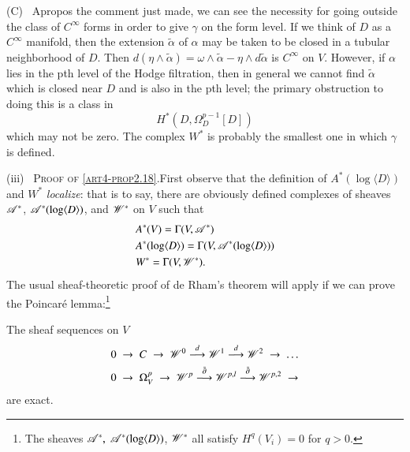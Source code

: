 \medskip
\noindent
(C)~ Apropos the comment just made, we can see the necessity for going outside the class of $C^\infty$ forms in order to give $\gamma$ on the form level. If we think of $D$ as a $C^\infty$ manifold, then the extension $\tilde{\alpha}$ of $\alpha$ may be taken to be closed in a tubular neighborhood of $D$. Then $d (\eta \wedge \tilde{\alpha}) = \omega \wedge \tilde{\alpha} - \eta \wedge d \tilde{\alpha}$ is $C^\infty$ on $V$. However, if $\alpha$ lies in the pth level of the Hodge filtration, then in general we cannot find $\tilde{\alpha}$ which is closed near $D$ and is also in the pth level; the primary obstruction to doing this is a class in 
$$
H^\ast (D, \Omega^{p-1}_D [D])
$$
which may not be zero. The complex $W^\ast$ is probably the smallest one in which $\gamma$ is defined.

\medskip
\noindent
(iii)~ \textsc{Proof of \eqref{art4-prop2.18}}.\pageoriginale First observe that the definition of $A^\ast (\log \langle D \rangle)$ and $W^\ast$ \textit{localize}: that is to say, there are obviously defined complexes of sheaves $\mathscr{A}^\ast$, $\mathscr{A}^\ast (\log \langle D \rangle)$, and $\mathscr{W}^\ast$ on $V$ such that
\begin{align*}
& A^\ast (V) = \Gamma (V, \mathscr{A}^\ast)\\
& A^\ast (\log \langle D \rangle) = \Gamma (V, \mathscr{A}^\ast (\log \langle D \rangle))\\
& W^\ast = \Gamma (V, \mathscr{W}^\ast).
\end{align*}
The usual sheaf-theoretic proof of de Rham's theorem will apply if we can prove the Poincar\'e lemma:\footnote[6]{The sheaves $\mathscr{A}^\ast, \; \mathscr{A}^\ast(\log \langle D \rangle)$, $\mathscr{W}^\ast$ all satisfy $H^q (V_i) =0$ for $q > 0$.}

\begin{lemma}\label{art4-lem2.20}
The sheaf sequences on $V$
\begin{align*}
& 0 \;  \to  \; C \; \to \; \mathscr{W}^0 \; {\displaystyle{\mathop{\longrightarrow}^d}} \; \mathscr{W}^1 \; {\displaystyle{\mathop{\longrightarrow}^d}} \; \mathscr{W}^2  \; \to  \; \ldots \\
& 0 \; \to \; \Omega^p_V \; \to \; \mathscr{W}^p \; {\displaystyle{\mathop{\longrightarrow}^{\bar{\partial}}}} \; \mathscr{W}^{p,l} \; {\displaystyle{\mathop{\longrightarrow}^{\bar{\partial}}}} \; \mathscr{W}^{p,2} \; \to 
\end{align*}
are exact.
\end{lemma}

